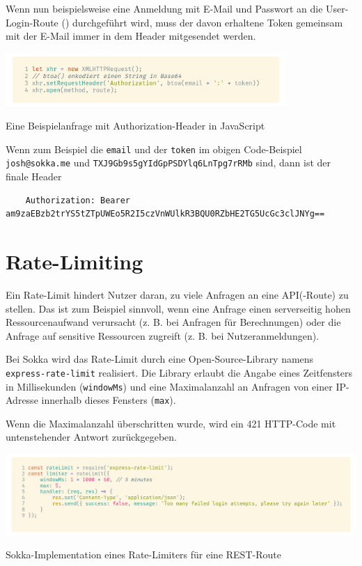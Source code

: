 Wenn nun beispielsweise eine Anmeldung mit E-Mail und Passwort an die User-Login-Route () durchgeführt wird, muss der davon erhaltene Token gemeinsam mit der E-Mail immer in dem Header mitgesendet werden.

\begin{code}[htp]
    \begin{center}
        \includegraphics[width=0.8\textwidth]{images/Backend/xhr.png}
        \vspace{-12pt}
        \caption{Eine Beispielanfrage mit Authorization-Header in JavaScript}
    \end{center}
\end{code}

Wenn zum Beispiel die \lstinline{email} und der \lstinline{token} im obigen Code-Beispiel \lstinline{josh@sokka.me} und \lstinline{TXJ9Gb9s5gYIdGpPSDYlq6LnTpg7rRMb} sind, dann ist der finale Header

\begin{lstlisting}
    Authorization: Bearer am9zaEBzb2trYS5tZTpUWEo5R2I5czVnWUlkR3BQU0RZbHE2TG5UcGc3clJNYg==
\end{lstlisting}

\section{Rate-Limiting}

Ein Rate-Limit hindert Nutzer daran, zu viele Anfragen an eine API(-Route) zu stellen. Das ist zum Beispiel sinnvoll, wenn eine Anfrage einen serverseitig hohen Ressourcenaufwand verursacht (z. B. bei Anfragen für Berechnungen) oder die Anfrage auf sensitive Ressourcen zugreift (z. B. bei Nutzeranmeldungen).

Bei Sokka wird das Rate-Limit durch eine Open-Source-Library namens \lstinline{express-rate-limit} realisiert. Die Library erlaubt die Angabe eines Zeitfensters in Millisekunden (\lstinline{windowMs}) und eine Maximalanzahl an Anfragen von einer IP-Adresse innerhalb dieses Fensters (\lstinline{max}).

Wenn die Maximalanzahl überschritten wurde, wird ein 421 HTTP-Code mit untenstehender Antwort zurückgegeben. \cite{nfriedly2021}

\begin{code}[htp]
    \begin{center}
        \includegraphics[width=1\textwidth]{images/Backend/ratelimit.png}
        \vspace{-25pt}
        \caption{Sokka-Implementation eines Rate-Limiters für eine REST-Route}
    \end{center}
\end{code}

